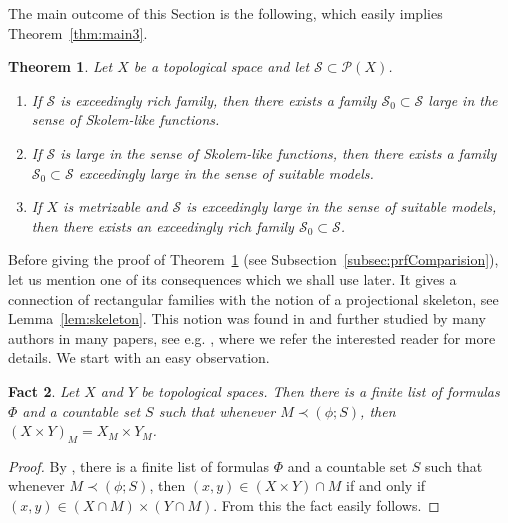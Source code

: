 \documentclass[11pt]{amsart}
\newtheorem{thm}{Theorem}
\newtheorem{fact}[thm]{Fact}
\theoremstyle{definition}
\theoremstyle{remark}
\newcommand{\PP}{\mathcal P}
\newcommand{\SSS}{\mathcal S}
\begin{document}
The main outcome of this Section is the following, which easily implies Theorem~\ref{thm:main3}.

\begin{thm}\label{thm:mainComparision}Let $X$ be a topological space and let $\SSS\subset \PP(X)$.
\begin{enumerate}
    \item\label{it:richImpliesMonotone} If $\SSS$ is exceedingly rich family, then there exists a family $\SSS_0\subset \SSS$ large in the sense of Skolem-like functions.
    \item\label{it:SkolemImpliesModels} If $\SSS$ is large in the sense of Skolem-like functions, then there exists a family $\SSS_0\subset \SSS$ exceedingly large in the sense of suitable models.
    \item\label{it:modelsImplyRich} If $X$ is metrizable and $\SSS$ is exceedingly large in the sense of suitable models, then there exists an exceedingly rich family $\SSS_0\subset \SSS$.
\end{enumerate}
\end{thm}

\noindent Before giving the proof of Theorem~\ref{thm:mainComparision} (see Subsection~\ref{subsec:prfComparision}), let us mention one of its consequences which we shall use later. It gives a connection of rectangular families with the notion of a projectional skeleton, see Lemma~\ref{lem:skeleton}. This notion was found in \cite{KubisSkeleton} and further studied by many authors in many papers, see e.g. \cite{CCS, Kal20}, where we refer the interested reader for more details. We start with an easy observation.

\begin{fact}\label{fact:productModels}Let $X$ and $Y$ be topological spaces. Then there is a finite list of formulas $\Phi$ and a countable set $S$ such that whenever $M\prec (\phi;S)$, then $(X\times Y)_M = X_M\times Y_M$.
\end{fact}
\begin{proof}By \cite[Lemma 7]{CCS0}, there is a finite list of formulas $\Phi$ and a countable set $S$ such that whenever $M\prec (\phi;S)$, then $(x,y)\in (X\times Y)\cap M$ if and only if $(x,y)\in (X\cap M)\times (Y\cap M)$. From this the fact easily follows.
\end{proof}
\end{document}
